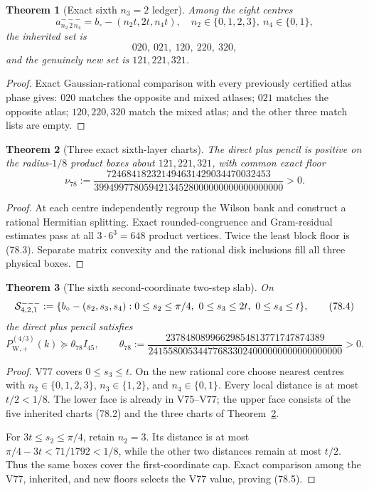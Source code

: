 \documentclass[11pt,oneside]{article}
\newtheorem{theorem}{Theorem}[section]
\theoremstyle{definition}
\theoremstyle{remark}
\begin{document}
\begin{theorem}[Exact sixth \(n_3=2\) ledger]
\label{thm:newv78-intersections}
Among the eight centres
\[
 a^{---}_{n_2\,2\,n_4}=b_\circ-(n_2t,2t,n_4t),
 \quad n_2\in\{0,1,2,3\},\ n_4\in\{0,1\},              \tag{78.1}
\]
the inherited set is
\[
 020,\ 021,\ 120,\ 220,\ 320,                          \tag{78.2}
\]
and the genuinely new set is \(121,221,321\).
\end{theorem}

\begin{proof}
Exact Gaussian-rational comparison with every previously certified
atlas phase gives: \(020\) matches the opposite and mixed atlases;
\(021\) matches the opposite atlas; \(120,220,320\) match the mixed
atlas; and the other three match lists are empty.
\end{proof}

\begin{theorem}[Three exact sixth-layer charts]
\label{thm:newv78-three-charts}
The direct plus pencil is positive on the radius-\(1/8\) product
boxes about \(121,221,321\), with common exact floor
\[
 \nu_{78}:=
 \frac{724684182321494631429034470032453}
 {39949977805942134528000000000000000000}>0.           \tag{78.3}
\]
\end{theorem}

\begin{proof}
At each centre independently regroup the Wilson bank and construct
a rational Hermitian splitting.  Exact rounded-congruence and
Gram-residual estimates pass at all
\(3\cdot6^3=648\) product vertices.  Twice the least block floor is
(78.3).  Separate matrix convexity and the rational disk inclusions
fill all three physical boxes.
\end{proof}

\begin{theorem}[The sixth second-coordinate two-step slab]
\label{thm:newv78-second-slab}
On
\[
 {\cal S}^{---}_{4,2,1}:=
 \{b_\circ-(s_2,s_3,s_4):
 0\le s_2\le\pi/4,\ 0\le s_3\le2t,\ 0\le s_4\le t\},  \tag{78.4}
\]
the direct plus pencil satisfies
\[
 P_{\mathrm W,+}^{(4/3)}(k)
 \succeq\theta_{78}I_{45},\qquad
 \theta_{78}:=
 \frac{23784808996629854813771747874389}
 {241558005344776833024000000000000000000}>0.          \tag{78.5}
\]
\end{theorem}

\begin{proof}
V77 covers \(0\le s_3\le t\).  On the new rational core choose
nearest centres with \(n_2\in\{0,1,2,3\}\),
\(n_3\in\{1,2\}\), and \(n_4\in\{0,1\}\).  Every local distance is
at most \(t/2<1/8\).  The lower face is already in V75--V77; the
upper face consists of the five inherited charts (78.2) and the
three charts of Theorem~\ref{thm:newv78-three-charts}.

For \(3t\le s_2\le\pi/4\), retain \(n_2=3\).  Its distance is at
most \(\pi/4-3t<71/1792<1/8\), while the other two distances remain
at most \(t/2\).  Thus the same boxes cover the first-coordinate
cap.  Exact comparison among the V77, inherited, and new floors
selects the V77 value, proving (78.5).
\end{proof}
\end{document}
